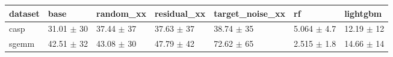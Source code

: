 \begin{tabular}{lllllll}
\toprule
dataset & base & random\_xx & residual\_xx & target\_noise\_xx & rf & lightgbm \\
\midrule
casp & 31.01 $\pm$ 30 & 37.44 $\pm$ 37 & 37.63 $\pm$ 37 & 38.74 $\pm$ 35 & 5.064 $\pm$ 4.7 & 12.19 $\pm$ 12 \\
sgemm & 42.51 $\pm$ 32 & 43.08 $\pm$ 30 & 47.79 $\pm$ 42 & 72.62 $\pm$ 65 & 2.515 $\pm$ 1.8 & 14.66 $\pm$ 14 \\
\bottomrule
\end{tabular}
